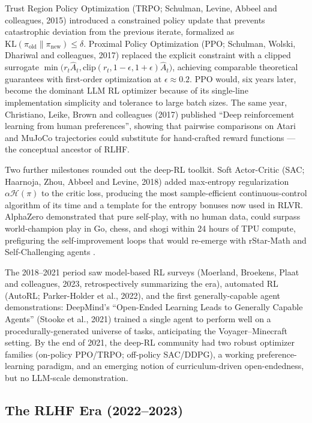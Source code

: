 \documentclass{article}
\begin{document}
Trust Region Policy Optimization (TRPO; Schulman, Levine, Abbeel and colleagues, 2015) introduced a constrained policy update that prevents catastrophic deviation from the previous iterate, formalized as \(\mathrm{KL}(\pi_{\mathrm{old}} \| \pi_{\mathrm{new}}) \le \delta\). Proximal Policy Optimization (PPO; Schulman, Wolski, Dhariwal and colleagues, 2017) replaced the explicit constraint with a clipped surrogate \(\min\bigl(r_t \hat A_t, \mathrm{clip}(r_t, 1-\epsilon, 1+\epsilon) \hat A_t\bigr)\), achieving comparable theoretical guarantees with first-order optimization at \(\epsilon \approx 0.2\). PPO would, six years later, become the dominant LLM RL optimizer because of its single-line implementation simplicity and tolerance to large batch sizes. The same year, Christiano, Leike, Brown and colleagues (2017) published ``Deep reinforcement learning from human preferences'', showing that pairwise comparisons on Atari and MuJoCo trajectories could substitute for hand-crafted reward functions --- the conceptual ancestor of RLHF.

Two further milestones rounded out the deep-RL toolkit. Soft Actor-Critic (SAC; Haarnoja, Zhou, Abbeel and Levine, 2018) added max-entropy regularization \(\alpha \mathcal{H}(\pi)\) to the critic loss, producing the most sample-efficient continuous-control algorithm of its time and a template for the entropy bonuses now used in RLVR. AlphaZero \citep{silver20172017} demonstrated that pure self-play, with no human data, could surpass world-champion play in Go, chess, and shogi within 24 hours of TPU compute, prefiguring the self-improvement loops that would re-emerge with rStar-Math \citep{guan20252025} and Self-Challenging agents \citep{zhou20252025}.

The 2018--2021 period saw model-based RL surveys (Moerland, Broekens, Plaat and colleagues, 2023, retrospectively summarizing the era), automated RL (AutoRL; Parker-Holder et al., 2022), and the first generally-capable agent demonstrations: DeepMind's ``Open-Ended Learning Leads to Generally Capable Agents'' (Stooke et al., 2021) trained a single agent to perform well on a procedurally-generated universe of tasks, anticipating the Voyager--Minecraft setting. By the end of 2021, the deep-RL community had two robust optimizer families (on-policy PPO/TRPO; off-policy SAC/DDPG), a working preference-learning paradigm, and an emerging notion of curriculum-driven open-endedness, but no LLM-scale demonstration.

\subsection{The RLHF Era (2022--2023)}\label{the-rlhf-era-20222023}
\end{document}
